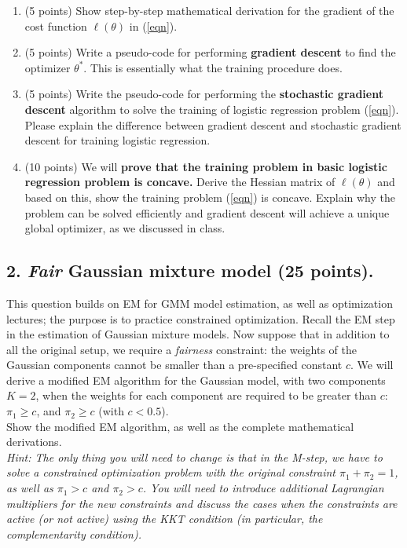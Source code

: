 \documentclass[12pt]{article}
\begin{document}
\begin{enumerate}
\item (5 points) Show step-by-step mathematical derivation for the gradient of the cost function $\ell(\theta)$ in (\ref{eqn}).
\item (5 points) Write a pseudo-code  for performing {\bf gradient descent} to find the optimizer $\theta^*$. This is essentially what the training procedure does. 
\item (5 points) Write the pseudo-code for performing the {\bf stochastic gradient descent} algorithm to solve the training of logistic regression problem (\ref{eqn}). Please explain the difference between gradient descent and stochastic gradient descent for training logistic regression.
\item (10 points) We will {\bf prove that the training problem in basic logistic regression problem is concave.} Derive the Hessian matrix of $\ell(\theta)$ and based on this, show the training problem (\ref{eqn}) is concave. Explain why the problem can be solved efficiently and gradient descent will achieve a unique global optimizer, as we discussed in class. 
\end{enumerate}


\subsection*{2. {\it Fair} Gaussian mixture model (25 points).}

This question builds on EM for GMM model estimation, as well as optimization lectures; the purpose is to practice constrained optimization. 
Recall the EM step in the estimation of Gaussian mixture models. Now suppose that in addition to all the original setup, we require a {\it fairness} constraint: the weights of the Gaussian components cannot be smaller than a pre-specified constant $c$. We will derive a modified EM algorithm for the Gaussian model, with two components $K = 2$, when the weights for each component are required to be greater than $c$: $\pi_1 \geq c$, and $\pi_2 \geq c$ (with $c<0.5$). \\

Show the modified EM algorithm, as well as the complete mathematical derivations. \\

\textit{\small Hint: The only thing you will need to change is that in the M-step, we have to solve a constrained optimization problem with the original constraint $\pi_1+\pi_2 = 1$, as well as $\pi_1 > c$ and $\pi_2 > c$. You will need to introduce additional Lagrangian multipliers for the new constraints and discuss the cases when the constraints are active (or not active) using the KKT condition (in particular, the complementarity condition).}
\end{document}

